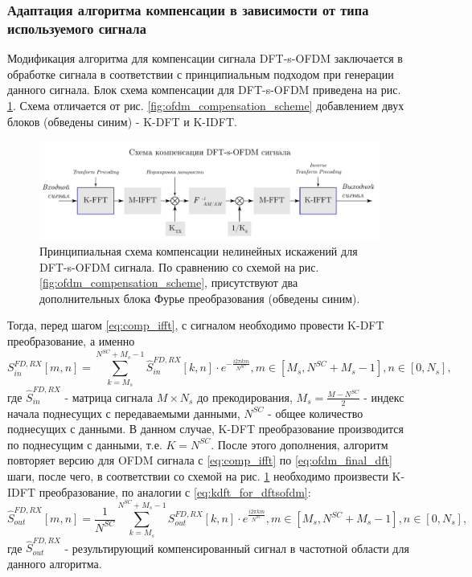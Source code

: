 \subsubsection{Адаптация алгоритма компенсации в зависимости от типа используемого сигнала}
\label{sec:apadt}
Модификация алгоритма для компенсации сигнала DFT-s-OFDM заключается в
обработке сигнала в соответствии с принципиальным подходом при генерации
данного сигнала. Блок схема компенсации для DFT-s-OFDM приведена на рис.
\ref{fig:dfts_compensation_scheme}. Схема отличается от рис.
\ref{fig:ofdm_compensation_scheme} добавлением двух блоков (обведены синим)
- K-DFT и K-IDFT.

\begin{figure}[h!]
    \centering
    \includegraphics[width=0.99\linewidth]{figs/dfts_compensation_scheme.pdf}
    \caption{Принципиальная схема компенсации нелинейных искажений для
    DFT-s-OFDM сигнала. По сравнению со схемой на рис.
    \ref{fig:ofdm_compensation_scheme}, присутствуют два дополнительных
    блока Фурье преобразования (обведены синим).}
    \label{fig:dfts_compensation_scheme}
\end{figure}

Тогда, перед шагом \ref{eq:comp_ifft}, с сигналом необходимо провести K-DFT
преобразование, а именно
\begin{equation}
    S^{FD, RX}_{in}[m, n] = \sum^{N^{SC}+M_s-1}_{k=M_s} \hat{S}^{FD, RX}_{in}[k, n]
    \cdot e^{-\frac{i 2 \pi k m}{N^{SC}}}, m \in [M_s, N^{SC}+M_s-1], n \in [0, N_s],
    \label{eq:kdft_for_dftsofdm}
\end{equation}
где $\hat{S}^{FD, RX}_{in}$ - матрица сигнала $M\times N_s$ до
прекодирования, $M_s = \frac{M-N^{SC}}{2}$ - индекс начала поднесущих с
передаваемыми данными, $N^{SC}$ - общее количество поднесущих с данными.
В данном случае, K-DFT преобразование производится по поднесущим с данными,
т.е. $K = N^{SC}$. После этого дополнения, алгоритм повторяет
версию для OFDM сигнала с \ref{eq:comp_ifft} по \ref{eq:ofdm_final_dft} шаги,
после чего, в соответствии со схемой на рис.
\ref{fig:dfts_compensation_scheme} необходимо произвести K-IDFT
преобразование, по аналогии с \ref{eq:kdft_for_dftsofdm}:
\begin{equation}
    \hat{S}^{FD, RX}_{out}[m, n] = \frac{1}{N^{SC}}\sum^{N^{SC}+M_s-1}_{k=M_s} S^{FD, RX}_{out}[k, n]
    \cdot e^{\frac{i 2 \pi k m}{N^{SC}}}, m \in [M_s, N^{SC}+M_s-1], n \in [0, N_s],
    \label{eq:kidft_for_dftsofdm}
\end{equation}
где $\hat{S}^{FD, RX}_{out}$ - результирующий компенсированный сигнал в
частотной области для данного алгоритма.

